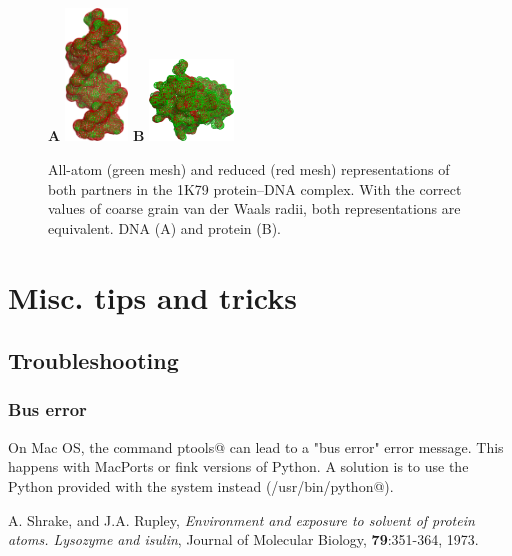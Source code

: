 \documentclass[12pt,a4paper]{article}
\begin{document}
\begin{figure}[Htbp]
\center
{\textbf A}
\includegraphics*[width=0.15\textwidth]{img/1K79_dna.png}
\hspace*{2cm}
{\textbf B}
\includegraphics*[width=0.20\textwidth]{img/1K79_prot.png}
\caption{All-atom (green mesh) and reduced (red mesh) representations of both 
partners in the 1K79 protein--DNA complex. With the correct values of coarse grain
van der Waals radii, both representations are equivalent.
DNA (A) and protein (B).}
\label{real_vdw}
\end{figure}

\newpage
\section{Misc. tips and tricks}


\subsection{Troubleshooting}

\subsubsection{Bus error}

On Mac OS, the command \verb@import ptools@ can lead to a "bus error" 
error message. This happens with MacPorts or fink versions of Python. 
A solution is to use the Python provided with the system instead 
(\verb@/usr/bin/python@).



\begin{thebibliography}{99}

 A. Shrake, and J.A. Rupley, 
{\it Environment and exposure to solvent of protein atoms. Lysozyme and
isulin}, 
Journal of Molecular Biology, {\bf 79}:351-364, 1973.

\end{thebibliography}
\end{document}
